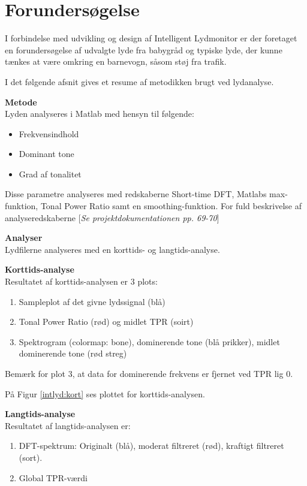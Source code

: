 \section{Forundersøgelse}
I forbindelse med udvikling og design af Intelligent Lydmonitor er der foretaget en forundersøgelse af udvalgte lyde fra babygråd og typiske lyde, der kunne tænkes at være omkring en barnevogn, såsom støj fra trafik.

I det følgende afsnit gives et resume af metodikken brugt ved lydanalyse. 

\textbf{Metode} \\
Lyden analyseres i Matlab med hensyn til følgende: 
\begin{itemize}
\item Frekvensindhold
\item Dominant tone
\item Grad af tonalitet
\end{itemize}

Disse parametre analyseres med redskaberne Short-time DFT, Matlabs max-funktion, Tonal Power Ratio samt en smoothing-funktion. For fuld beskrivelse af analyseredskaberne [\textit{Se projektdokumentationen pp. 69-70}]

\textbf{Analyser}\\
Lydfilerne analyseres med en korttids- og langtids-analyse. 

\textbf{Korttids-analyse}\\
Resultatet af korttids-analysen er 3 plots:
\begin{enumerate}
\item Sampleplot af det givne lydssignal (blå)
\item Tonal Power Ratio (rød) og midlet TPR (soirt)
\item Spektrogram (colormap: bone), dominerende tone (blå prikker), midlet dominerende tone (rød streg)
\end{enumerate}
Bemærk for plot 3, at data for dominerende frekvens er fjernet ved TPR lig 0.

På Figur \ref{intlyd:kort} ses plottet for korttids-analysen.



\textbf{Langtids-analyse} \\
Resultatet af langtids-analysen er:
\begin{enumerate}
\item DFT-spektrum: Originalt (blå), moderat filtreret (rød), kraftigt filtreret (sort).
\item Global TPR-værdi
\end{enumerate}

